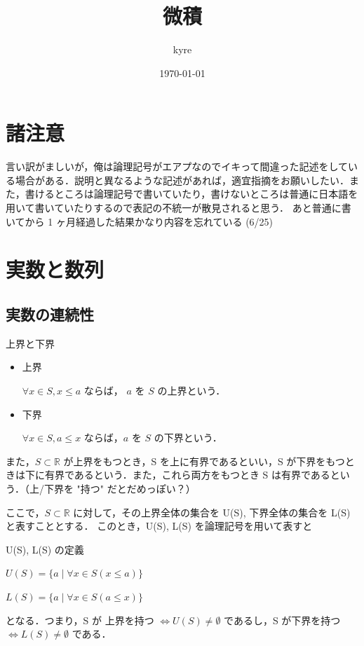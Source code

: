 \documentclass[a4paper]{ltjsarticle}
\title{微積}
\author{kyre}
\date{\today}
\begin{document}
\section*{諸注意}
言い訳がましいが，俺は論理記号がエアプなのでイキって間違った記述をしている場合がある．説明と異なるような記述があれば，適宜指摘をお願いしたい．また，書けるところは論理記号で書いていたり，書けないところは普通に日本語を用いて書いていたりするので表記の不統一が散見されると思う．
あと普通に書いてから 1 ヶ月経過した結果かなり内容を忘れている (6/25)

\tableofcontents
\clearpage

\section{実数と数列}

\subsection{実数の連続性}

\begin{tcb}{上界と下界}{}
\begin{itemize}
\item 上界 

$\forall x \in S, x \leq a$ ならば， $a$ を $S$ の上界という．

\item 下界 

$\forall x \in S, a \leq x$ ならば，$a$ を $S$ の下界という．

\end{itemize}
\end{tcb}

また，$S \subset \mathbb{R}$ が上界をもつとき，S を上に有界であるといい，S が下界をもつときは下に有界であるという．また，これら両方をもつとき S は有界であるという．（上/下界を "持つ" だとだめっぽい？）

ここで，$S \subset \mathbb{R}$ に対して，その上界全体の集合を U(S), 下界全体の集合を L(S) と表すこととする．
このとき，U(S), L(S) を論理記号を用いて表すと
\begin{tcb}{U(S), L(S) の定義}{}
\centerline
{$
U(S) = \{a \mid \forall x \in S (x \leq a)\}
$}
\centerline
{$
L(S) = \{a \mid \forall x \in S (a \leq x)\}
$}
\end{tcb}
となる．つまり，S が 上界を持つ $\Leftrightarrow U(S) \neq \emptyset$  であるし，S が下界を持つ $\Leftrightarrow L(S) \neq \emptyset$ である．

\pagebreak
\end{document}

